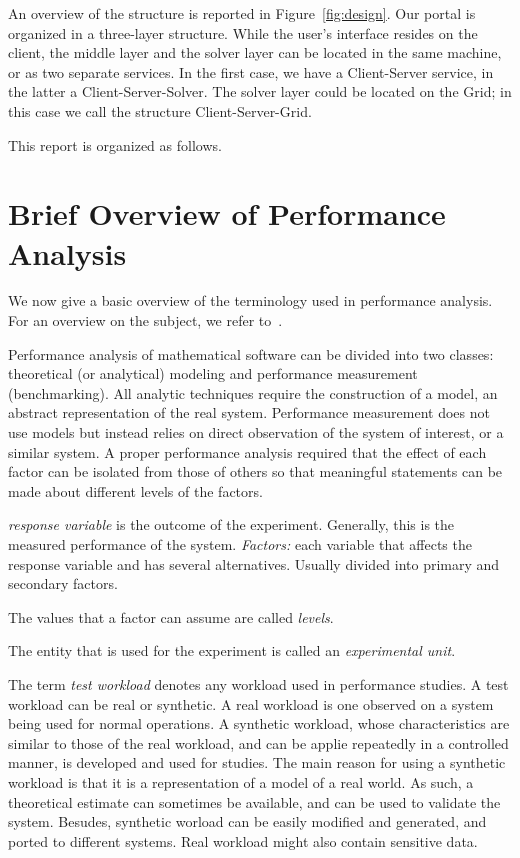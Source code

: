 \documentclass[11pt,relax]{SANDreport}
\begin{document}
An overview of the structure is reported in Figure~\ref{fig:design}.
Our portal is organized in a three-layer structure. While the user's interface
resides on the client, the middle layer and the solver layer can be located in
the same machine, or as two separate services. In the first case, we have a
Client-Server service, in the latter a Client-Server-Solver. The solver layer
could be located on the Grid; in this case we call the structure
Client-Server-Grid.

\medskip

This report is organized as follows.

\section{Brief Overview of Performance Analysis}

We now give a basic overview of the terminology used in performance analysis.
For an overview on the subject, we refer to~\cite{jain91art}.

Performance analysis of mathematical software can be divided into two classes:
theoretical (or analytical) modeling and performance measurement (benchmarking).
All analytic techniques require the
construction of a model, an abstract representation of the real system. 
Performance measurement does not
use models but instead relies on direct observation of the system of interest,
or a similar system.
A proper performance analysis required that the effect of each factor can be
isolated from those of others so that meaningful statements can be made about
different levels of the factors.

{\sl response variable} is the outcome of the experiment. Generally, this is
the measured performance of the system. 
{\sl Factors:} each variable that affects the response variable and has
several alternatives. Usually divided into primary and secondary factors.

The values that a factor can assume are called {\sl levels}. 

The entity that is used for the experiment is called an {\sl experimental
  unit}.

\smallskip

The term {\sl test workload} denotes any workload used in performance studies.
A test workload can be real or synthetic. A real workload is one observed on a
system being used for normal operations. A synthetic workload, whose
characteristics are similar to those of the real workload, and can be applie
repeatedly in a controlled manner, is developed and used for studies. The main
reason for using a synthetic workload is that it is a representation of a
model of a real world. As such, a theoretical estimate can sometimes be
available, and can be used to validate the system. Besudes, synthetic worload
can be easily modified and generated, and ported to different systems. Real
workload might also contain sensitive data.
\end{document}
